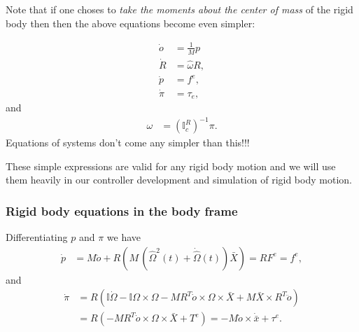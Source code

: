 \documentclass[graybox,envcountchap,sectrefs]{svmonoMuga}
\begin{document}
Note that if one choses to \textit{take the moments about the center of mass}  of the rigid body then then the above equations become even simpler:

\begin{align}
\dot{o}&=\frac{1}{M}p\\
\dot{R}&=\widehat{\omega}R,\\
\dot{p}&=f^e,\\
\dot{\pi}&=\tau_e,
\end{align} 
and 
\begin{align}
\omega &=(\mathbb{I}_c^R)^{-1}\pi.
\end{align}
Equations of systems don't come any simpler than this!!!

These simple expressions are valid for any rigid body motion and we will use them heavily in our controller development and simulation of rigid body motion.

\subsubsection{Rigid body equations in the body frame}

Differentiating $p$ and $\pi$ we have 
\begin{align}
\dot{p}&=M\ddot{o}+R\left(M\,\left(\widehat{\Omega}^2(t) +\dot{\widehat{\Omega}}(t)\right)\bar{X}\right)=  R F^e=f^e,
\end{align}
and
\begin{align}
\dot{\pi}&=R\left(\mathbb{I}\dot{\Omega}-\mathbb{I}{\Omega}\times \Omega-MR^T\dot{o}\times \Omega\times \bar{X} +M\bar{X}\times R^T\ddot{o}\right)\\
&=R\left(-MR^T\dot{o}\times \Omega\times {\bar{X}}+T^e\right)=-M\dot{o}\times \dot{\bar{x}}+\tau^e.
\end{align}
\end{document}
